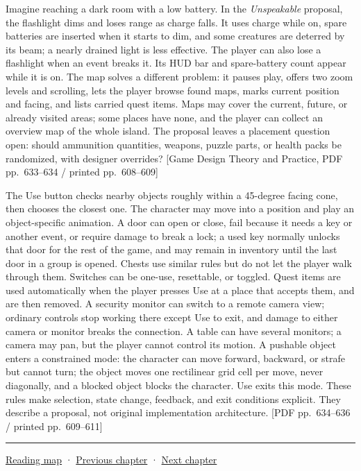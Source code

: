 Imagine reaching a dark room with a low battery. In the \emph{Unspeakable} proposal, the flashlight dims and loses range as charge falls. It uses charge while on, spare batteries are inserted when it starts to dim, and some creatures are deterred by its beam; a nearly drained light is less effective. The player can also lose a flashlight when an event breaks it. Its HUD bar and spare-battery count appear while it is on. The map solves a different problem: it pauses play, offers two zoom levels and scrolling, lets the player browse found maps, marks current position and facing, and lists carried quest items. Maps may cover the current, future, or already visited areas; some places have none, and the player can collect an overview map of the whole island. The proposal leaves a placement question open: should ammunition quantities, weapons, puzzle parts, or health packs be randomized, with designer overrides? {[}Game Design Theory and Practice, PDF pp.~633--634 / printed pp.~608--609{]}

The Use button checks nearby objects roughly within a 45-degree facing cone, then chooses the closest one. The character may move into a position and play an object-specific animation. A door can open or close, fail because it needs a key or another event, or require damage to break a lock; a used key normally unlocks that door for the rest of the game, and may remain in inventory until the last door in a group is opened. Chests use similar rules but do not let the player walk through them. Switches can be one-use, resettable, or toggled. Quest items are used automatically when the player presses Use at a place that accepts them, and are then removed. A security monitor can switch to a remote camera view; ordinary controls stop working there except Use to exit, and damage to either camera or monitor breaks the connection. A table can have several monitors; a camera may pan, but the player cannot control its motion. A pushable object enters a constrained mode: the character can move forward, backward, or strafe but cannot turn; the object moves one rectilinear grid cell per move, never diagonally, and a blocked object blocks the character. Use exits this mode. These rules make selection, state change, feedback, and exit conditions explicit. They describe a proposal, not original implementation architecture. {[}PDF pp.~634--636 / printed pp.~609--611{]}

\begin{center}\rule{0.5\linewidth}{0.5pt}\end{center}

\href{Chapter\%20Edition/03\%20-\%20Game\%20Engine/00\%20-\%20Reading\%20Map}{Reading map} · \hyperref[06-engine-ii-ch030]{Previous chapter} · \hyperref[06-engine-ii-ch032]{Next chapter}
